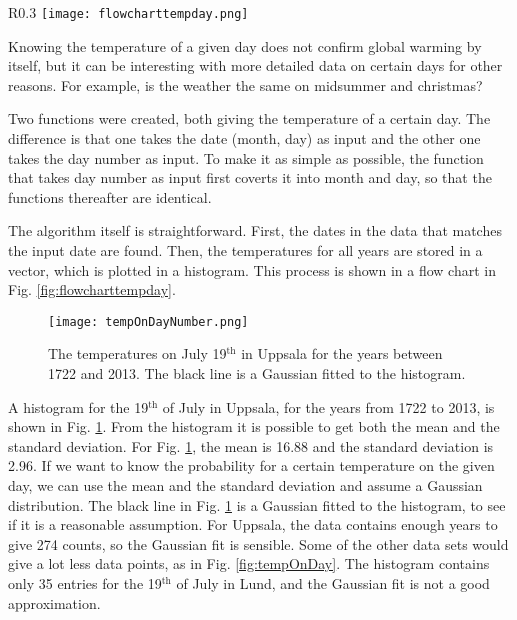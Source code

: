 

\begin{wrapfigure}{R}{0.3\textwidth}
\texttt{[image: flowcharttempday.png]}
\caption{\label{fig:flowcharttempday} Flow chart for the function that gives the temperature of a given day.}
\end{wrapfigure}

Knowing the temperature of a given day does not confirm global warming by itself, but it can be interesting with more detailed data on certain days for other reasons. For example, is the weather the same on midsummer and christmas? 

Two functions were created, both giving the temperature of a certain day. The difference is that one takes the date (month, day) as input and the other one takes the day number as input. To make it as simple as possible, the function that takes day number as input first coverts it into month and day, so that the functions thereafter are identical. 

The algorithm itself is straightforward. First, the dates in the data that matches the input date are found. Then, the temperatures for all years are stored in a vector, which is plotted in a histogram. This process is shown in a flow chart in Fig. \ref{fig:flowcharttempday}. 

\begin{figure}[ht]
\begin{center}
\texttt{[image: tempOnDayNumber.png]}
\caption{\label{fig:tempOnDayNumber} The temperatures on July 19$^{\text{th}}$ in Uppsala for the years between 1722 and 2013. The black line is a Gaussian fitted to the histogram.}
\end{center}
\end{figure}

A histogram for the 19$^{\text{th}}$ of July in Uppsala, for the years from 1722 to 2013, is shown in Fig. \ref{fig:tempOnDayNumber}. From the histogram it is possible to get both the mean and the standard deviation. For Fig. \ref{fig:tempOnDayNumber}, the mean is 16.88 and the standard deviation is 2.96. If we want to know the probability for a certain temperature on the given day, we can use the mean and the standard deviation and assume a Gaussian distribution. The black line in Fig. \ref{fig:tempOnDayNumber} is a Gaussian fitted to the histogram, to see if it is a reasonable assumption. For Uppsala, the data contains enough years to give 274 counts, so the Gaussian fit is sensible. Some of the other data sets would give a lot less data points, as in Fig. \ref{fig:tempOnDay}. The histogram contains only 35 entries for the 19$^{\text{th}}$ of July in Lund, and the Gaussian fit is not a good approximation. 


